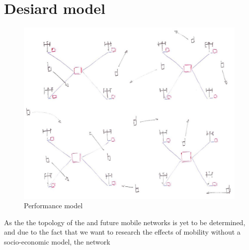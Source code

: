 \section{Desiard model}

\begin{figure}[tb]
	\centering
	\includegraphics[width=\linewidth]{performance_delay.jpg} 
	\caption{Performance model}
	\label{fig:performance_model}
\end{figure}

As the the topology of the \xcloud and future mobile networks is yet to be determined, and due to the fact that we want to research the effects of mobility without a socio-economic model, the network 